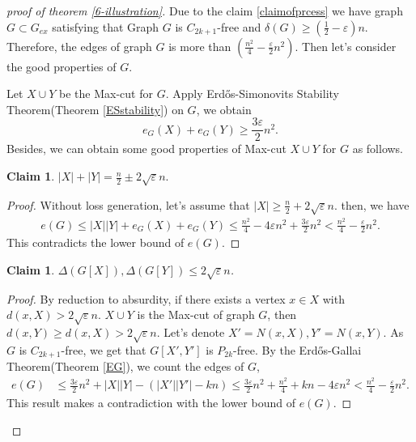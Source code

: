 \documentclass{article}
\newtheorem{claim}[theorem]{Claim}
\theoremstyle{definition}
\def\Erdos{Erd\H{o}s}
\renewcommand{\epsilon}{\varepsilon}
\begin{document}
\begin{proof}[proof of theorem \ref{6-illustration}]
Due to the claim \ref{claimofprcess} we have graph $G \subset G_{ex}$ satisfying that Graph $G$ is $C_{2k+1}$-free and $\delta(G) \ge (\frac{1}{2}-\epsilon)n$. Therefore, the edges of graph $G$ is more than $(\frac{n^2}{4}-\frac{\epsilon}{2}n^2)$. Then let's consider the good properties of $G$.

Let $X \cup Y$ be the Max-cut for $G$. Apply \Erdos{}-Simonovits Stability Theorem(Theorem \ref{ESstability}) on $G$, we obtain 
$$e_G(X)+e_G(Y) \ge \frac{3\epsilon}{2}n^2.$$
Besides, we can obtain some good properties of Max-cut $X \cup Y$ for $G$ as follows.

\begin{claim}\label{XYsize}
    $|X|+|Y| = \frac{n}{2} \pm 2\sqrt{\epsilon}n.$
\end{claim}

\begin{proof}
Without loss generation, let's assume that $|X| \ge \frac{n}{2} + 2\sqrt{\epsilon}n$. then, we have
\begin{align*}
e(G) \le |X||Y|+e_G(X)+e_G(Y)
\le \frac{n^2}{4}-4\epsilon n^2+\frac{3\epsilon}{2}n^2 < \frac{n^2}{4}-\frac{\epsilon}{2}n^2.
\end{align*}
This contradicts the lower bound of $e(G)$.
\end{proof}

\begin{claim}\label{MaxDegree}
    $\Delta(G[X]),\Delta(G[Y]) \le 2\sqrt{\epsilon}n$.
\end{claim}

\begin{proof}
By reduction to absurdity, if there exists a vertex $x \in X$ with $d(x,X) > 2\sqrt{\epsilon}n$. $X \cup Y$ is the Max-cut of graph $G$, then $d(x,Y) \ge d(x,X) > 2\sqrt{\epsilon}n$. Let's denote $X'=N(x,X),Y'=N(x,Y)$. As $G$ is $C_{2k+1}$-free, we get that $G[X',Y']$ is $P_{2k}$-free. By the \Erdos{}-Gallai Theorem(Theorem \ref{EG}), we count the edges of $G$,
\begin{align*}
e(G) &\le \frac{3\epsilon}{2}n^2 +|X||Y|-(|X'||Y'|-kn) \le \frac{3\epsilon}{2}n^2 + \frac{n^2}{4}+kn-4 \epsilon n^2 < \frac{n^2}{4}-\frac{\epsilon}{2}n^2.
\end{align*}
This result makes a contradiction with the lower bound of $e(G)$.
\end{proof}


\end{proof}
\end{document}
